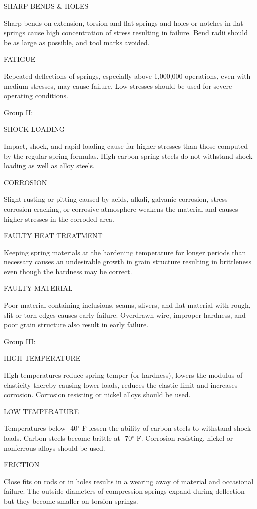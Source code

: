\documentclass[10pt]{article}
\begin{document}
SHARP BENDS \& HOLES

Sharp bends on extension, torsion and flat springs and holes or notches in flat springs cause high concentration of stress resulting in failure. 
Bend radii should be as large as possible, and tool marks avoided.

FATIGUE

Repeated deflections of springs, especially above 1,000,000 operations, even with medium stresses, may cause failure. 
Low stresses should be used for severe operating conditions.

Group II:

SHOCK LOADING

Impact, shock, and rapid loading cause far higher stresses than those computed by the regular spring formulas. 
High carbon spring steels do not withstand shock loading as well as alloy steels.

CORROSION

Slight rusting or pitting caused by acids, alkali, galvanic corrosion, stress corrosion cracking, or corrosive atmosphere weakens the material and causes higher stresses in the corroded area.

FAULTY HEAT TREATMENT

Keeping spring materials at the hardening temperature for longer periods than necessary causes an undesirable growth in grain structure resulting in brittleness even though the hardness may be correct.

FAULTY MATERIAL

Poor material containing inclusions, seams, slivers, and flat material with rough, slit or torn edges causes early failure.
Overdrawn wire, improper hardness, and poor grain structure also result in early failure.

Group III:

HIGH TEMPERATURE

High temperatures reduce spring temper (or hardness), lowers the modulus of elasticity thereby causing lower loads, reduces the elastic limit and increases corrosion. 
Corrosion resisting or nickel alloys should be used.

LOW TEMPERATURE

Temperatures below -40$^{\circ}$ F lessen the ability of carbon steels to withstand shock loads. Carbon steels become brittle at -70$^{\circ}$ F. 
Corrosion resisting, nickel or nonferrous alloys should be used.

FRICTION

Close fits on rods or in holes results in a wearing away of material and occasional failure.
The outside diameters of compression springs expand during deflection but they become smaller on torsion springs.
\end{document}
